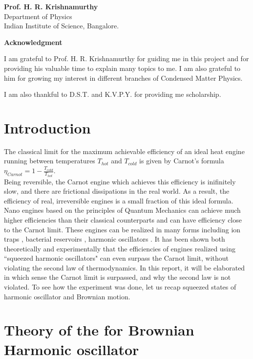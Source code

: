 \documentclass[12pt, twoside]{article}
\begin{document}
\textbf{Prof. H. R. Krishnamurthy}\\
Department of Physics\\
Indian Institute of Science, Bangalore.
\newpage
\begin{center}
	\textbf{Acknowledgment}
\end{center}

I am grateful to Prof. H. R. Krishnamurthy for guiding me in this project and for providing his valuable time to explain many topics to me. I am also grateful to him for growing my interest in different branches of Condensed Matter Physics.

I am also thankful to D.S.T. and K.V.P.Y. for providing me scholarship.
\tableofcontents

\section{Introduction}
The classical limit for the maximum achievable efficiency of an ideal heat engine running between temperatures $T_{hot}$ and $T_{cold}$ is given by Carnot's formula $\eta_{Carnot} = 1 - \frac{T_{cold}}{T_{hot}}$.\\
Being reversible, the Carnot engine which achieves this efficiency is inifinitely slow, and there are frictional dissipations in the real world. As a result, the efficiency of real, irreversible engines is a small fraction of this ideal formula.
Nano engines based on the principles of Quantum Mechanics can achieve much higher efficiencies than their classical counterparts \cite{Millen_2016} and can have efficiency close to the Carnot limit.
These engines can be realized in many forms including ion traps \cite{ion_trap_abah}, bacterial reservoirs \cite{bacterial_reservoir}, harmonic oscillators \cite{harmonic_oscl_engine}.
It has been shown both theoretically \cite{abah_et_al} and experimentally \cite{klaers} that the efficiencies of engines realized using ``squeezed harmonic oscillators" can even surpass the Carnot limit, without violating the second law of thermodynamics. In this report, it will be elaborated in which sense the Carnot limit is surpassed, and why the second law is not violated.
To see how the experiment \cite{klaers} was done, let us recap squeezed states of harmonic oscillator and Brownian motion.
\section{Theory of the for Brownian Harmonic oscillator}
\end{document}
